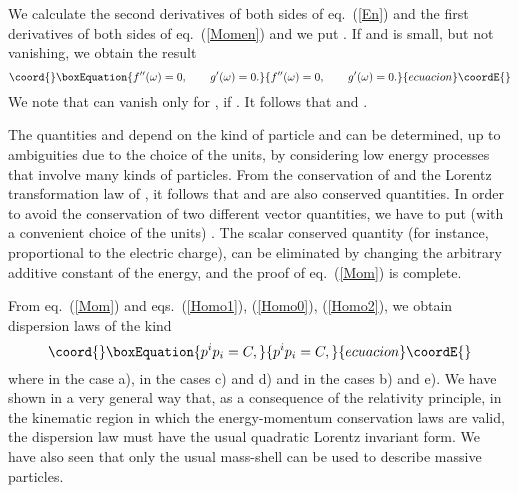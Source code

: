\documentclass[a4paper,12pt]{article}
\begin{document}
We calculate the second derivatives of both sides of eq.\ (\ref{En}) and the first derivatives of both sides of eq.\ (\ref{Momen}) and we put \coordHE{}. If \coordHE{} and \myHighlight{$\theta$}\coordHE{} is small, but not vanishing, we obtain the result
\begin{equation}\coord{}\boxEquation{ 
f''(\omega) = 0, \qquad  g'(\omega) = 0.
}{ 
f''(\omega) = 0, \qquad  g'(\omega) = 0.
}{ecuacion}\coordE{}\end{equation}
We note that \myHighlight{$\eta = |\vec\pi|$}\coordHE{} can vanish only for \coordHE{}, if \coordHE{}.  It follows that \coordHE{} and \coordHE{}. 

The quantities \coordHE{} and \coordHE{} depend on the kind of particle and can be determined, up to ambiguities due to the choice of the units, by considering low energy processes that involve many kinds of particles.  From the conservation of \coordHE{} and the Lorentz transformation law of \coordHE{}, it follows that \coordHE{} and \coordHE{} are also conserved quantities. In order to avoid the conservation of two different vector quantities, we have to put (with a convenient choice of the units) \coordHE{}. The scalar conserved quantity \coordHE{} (for instance, proportional to the electric charge), can be eliminated by changing the arbitrary additive constant of the energy, and the proof of eq.\ (\ref{Mom}) is complete.

From eq.\ (\ref{Mom}) and eqs.\ (\ref{Homo1}), (\ref{Homo0}), (\ref{Homo2}), we obtain dispersion laws of the kind
\begin{equation}\coord{}\boxEquation{ 
p^i p_i = C,
}{ 
p^i p_i = C,
}{ecuacion}\coordE{}\end{equation} 
where \coordHE{} in the case a), \coordHE{} in the cases c) and d) and \coordHE{} in the cases b) and e). We have shown in a very general way that, as a consequence of the relativity principle, in the kinematic region in which the energy-momentum conservation laws are valid, the dispersion law must have the usual quadratic Lorentz invariant form. We have also seen that only the usual mass-shell \coordHE{} can be used to describe massive particles.  
\end{document}
